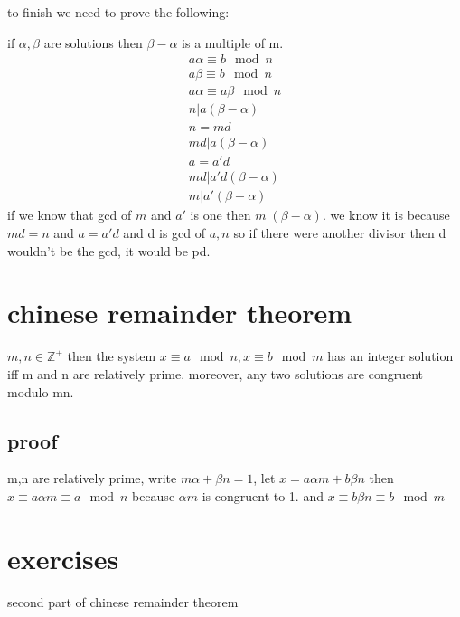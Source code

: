 \documentclass[letterpaper]{article}
\begin{document}
to finish we need to prove the following:

if $\alpha,\beta$  are solutions then $\beta-\alpha$ is a multiple of m.
\begin{align*}
  a\alpha\equiv b\mod n\\
  a\beta\equiv b\mod n\\
  a\alpha \equiv a\beta\mod n\\
  n|a(\beta-\alpha)\\
  n=md\\
  md|a(\beta-\alpha)\\
  a=a'd\\
  md|a'd(\beta-\alpha)\\
  m|a'(\beta-\alpha)
\end{align*}
if we know that gcd of $m$ and $a'$ is one then $m|(\beta-\alpha)$. we know it is because $md=n$  and $a=a'd$ and d is gcd of $a,n$ so if there were another divisor then d wouldn't be the gcd, it would be pd.

\section*{chinese remainder theorem}
$m,n\in\mathbb{Z}^+$ then the system $x\equiv a\mod n, x\equiv b\mod m$ has an integer solution iff m and n are relatively prime. moreover, any two solutions are congruent modulo mn.

\subsection*{proof}
m,n are relatively prime, write $m\alpha+\beta n=1$, let $x=a\alpha m+b\beta n$ then $x\equiv a\alpha m\equiv a\mod n$ because $\alpha m$ is congruent to 1. and $x\equiv b\beta n\equiv b\mod m$
\section*{exercises}
second part of chinese remainder theorem
\end{document}
